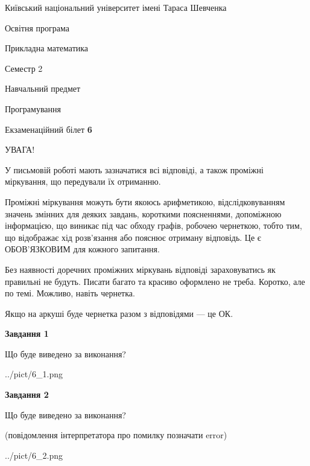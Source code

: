 \documentclass[12pt, ukrainian]{article}
\begin{document}
{{\begin {small}\par
{ \center  Київський національний університет імені Тараса Шевченка \par}
{\parbox {5 cm}{Освітня програма \hfill}{\parbox {7 cm}{Прикладна математика\hfill}}\parbox {6 cm}{\hfill Семестр 2}}\par
{\parbox {5 cm} {Навчальний предмет \hfill}\parbox {7 cm}{Програмування \hfill}\parbox {6cm}{\hfill}\par}\vspace{-7pt} \end{small}}{\center Екзаменаційний білет \No \textbf
{ 6 }\par}}
{
\begin {large}
УВАГА!

У письмовій роботі мають зазначатися всі відповіді, а також проміжні міркування, що передували їх отриманню.

Проміжні міркування можуть бути якоюсь арифметикою, відслідковуванням зна\-чень змінних для деяких завдань,
короткими поясненнями, допоміжною інформацією, що виникає під час обходу графів, робочею чернеткою,
тобто тим, що відображає хід розв’язання або пояснює отриману відповідь.
Це є ОБОВ’ЯЗКОВИМ для кожного запитання.

Без наявності доречних проміжних міркувань відповіді зараховуватись як правиль\-ні не будуть.
Писати багато та красиво оформлено не треба. Коротко, але по темі. Можли\-во, навіть чернетка.

Якщо на аркуші буде чернетка разом з відповідями --- це ОК.

\newpage

{\begin {center}\textbf{Завдання 1}\end {center}}\par
Що буде виведено за виконання?\par
\begin{center}
	{../pict/6_1.png}
\end{center}
\newpage

{\begin {center}\textbf{Завдання 2}\end {center}}\par
Що буде виведено за виконання?\par
 (повідомлення інтерпретатора про помилку позначати error)\par
\begin{center}
	{../pict/6_2.png}
\end{center}
\newpage


\end{large}}
\end{document}
